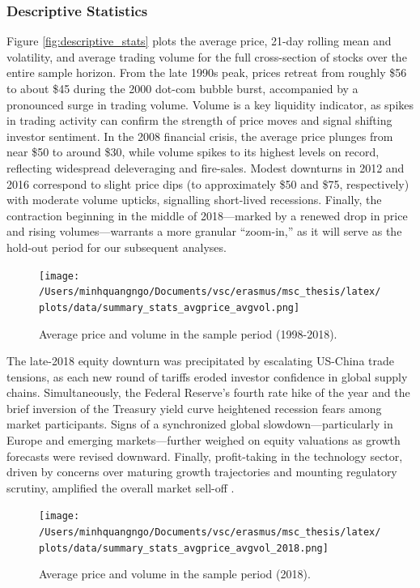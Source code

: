 \subsubsection{Descriptive Statistics}
Figure \ref{fig:descriptive_stats} plots the average price, 21-day rolling mean and volatility, and average trading volume for the full cross-section of stocks over the entire sample horizon. From the late 1990s peak, prices retreat from roughly \$56 to about \$45 during the 2000 dot-com bubble burst, accompanied by a pronounced surge in trading volume. Volume is a key liquidity indicator, as spikes in trading activity can confirm the strength of price moves and signal shifting investor sentiment. In the 2008 financial crisis, the average price plunges from near \$50 to around \$30, while volume spikes to its highest levels on record, reflecting widespread deleveraging and fire-sales. Modest downturns in 2012 and 2016 correspond to slight price dips (to approximately \$50 and \$75, respectively) with moderate volume upticks, signalling short-lived recessions. Finally, the contraction beginning in the middle of 2018—marked by a renewed drop in price and rising volumes—warrants a more granular “zoom-in,” as it will serve as the hold-out period for our subsequent analyses.


\begin{figure}[H]
    \centering
    \texttt{[image: /Users/minhquangngo/Documents/vsc/erasmus/msc\_thesis/latex/plots/data/summary\_stats\_avgprice\_avgvol.png]}
    \caption{Average price and volume in the sample period (1998-2018).}
    \label{fig:avgprice_avgvol}
\end{figure}


The late-2018 equity downturn was precipitated by escalating US-China trade tensions, as each new round of tariffs eroded investor confidence in global supply chains. Simultaneously, the Federal Reserve's fourth rate hike of the year and the brief inversion of the Treasury yield curve heightened recession fears among market participants. Signs of a synchronized global slowdown—particularly in Europe and emerging markets—further weighed on equity valuations as growth forecasts were revised downward. Finally, profit-taking in the technology sector, driven by concerns over maturing growth trajectories and mounting regulatory scrutiny, amplified the overall market sell-off \cite{reuters_2018}.

\begin{figure}[H]
     \centering
     \texttt{[image: /Users/minhquangngo/Documents/vsc/erasmus/msc\_thesis/latex/plots/data/summary\_stats\_avgprice\_avgvol\_2018.png]}
     \caption{Average price and volume in the sample period (2018).}
     \label{fig:avgprice_avgvol_2018}
 \end{figure}
 
